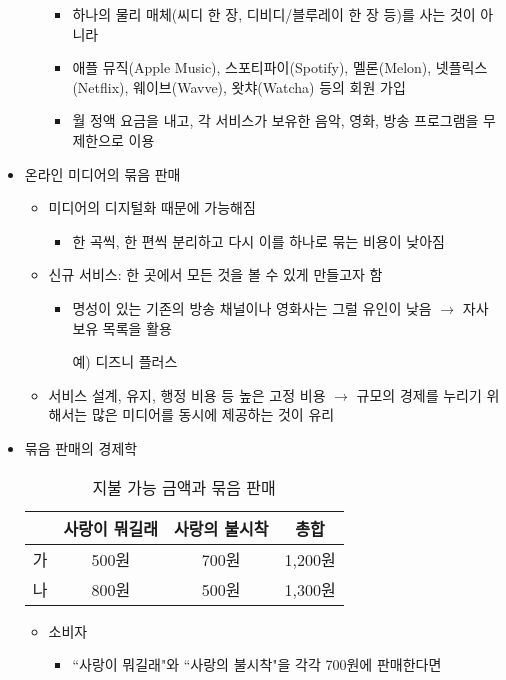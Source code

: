 \begin{itemize}
\begin{itemize}
\begin{itemize}
		\item 하나의 물리 매체(씨디 한 장, 디비디/블루레이 한 장 등)를 사는 것이 아니라
		\item 애플 뮤직(Apple Music), 스포티파이(Spotify), 멜론(Melon), 넷플릭스(Netflix), 웨이브(Wavve), 왓챠(Watcha) 등의 회원 가입
		\item  월 정액 요금을 내고, 각 서비스가 보유한 음악, 영화, 방송 프로그램을 무제한으로 이용
		\end{itemize}
	\end{itemize}
\item 온라인 미디어의 묶음 판매 
	\begin{itemize}
	\item 미디어의 디지털화 때문에 가능해짐
		\begin{itemize}
		\item 한 곡씩, 한 편씩 분리하고 다시 이를 하나로 묶는 비용이 낮아짐
		\end{itemize}	
	\item 신규 서비스: 한 곳에서 모든 것을 볼 수 있게 만들고자 함
		\begin{itemize}
		\item 명성이 있는 기존의 방송 채널이나 영화사는 그럴 유인이 낮음 $\rightarrow$ 자사 보유 목록을 활용
		\item[예)] 디즈니 플러스
		\end{itemize}
	\item 서비스 설계, 유지, 행정 비용 등 높은 고정 비용 $\rightarrow$ 규모의 경제를 누리기 위해서는 많은 미디어를 동시에 제공하는 것이 유리
	\end{itemize}
\item 묶음 판매의 경제학 \citep{Waldfogel:2020aa}
			\begin{table}[htp]
			\caption{지불 가능 금액과 묶음 판매}
			\begin{center}
			\begin{tabular}{cccc}
			\toprule
			 &  사랑이 뭐길래 & 사랑의 불시착 & 총합 \\
			\midrule
			가 & 500원 & 700원 & 1,200원 \\
			나 & 800원 & 500원 & 1,300원 \\
			\bottomrule
			\end{tabular}
			\end{center}
			\label{tab:bundle}
			\end{table}%
	\begin{itemize}
	\item 소비자
		\begin{itemize}
		\item ``사랑이 뭐길래"와 ``사랑의 불시착"을 각각 700원에 판매한다면

\end{itemize}
\end{itemize}
\end{itemize}
